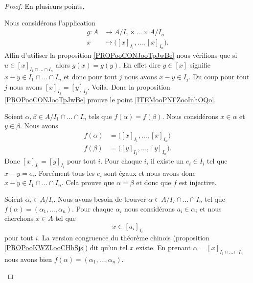 \begin{proof}
	En plusieurs points.
	\begin{subproof}
		Nous considérons l'application
		\begin{equation}
			\begin{aligned}
				g\colon A & \to A/I_1\times \ldots \times A/I_n             \\
				x         & \mapsto \big( [x]_{I_1},\ldots,[x]_{I_n} \big).
			\end{aligned}
		\end{equation}
		Affin d'utiliser la proposition \ref{PROPooCONJooTpJwBe} nous vérifions que si \( u\in [x]_{I_1\cap\ldots \cap I_n}\) alors \( g(x)=g(y)\). En effet dire \( y\in[x]\) signifie \( x-y\in I_1\cap\ldots\cap I_n\) et donc pour tout \( j\) nous avons \( x-y\in I_j\). Du coup pour tout \( j\) nous avons \( [x]_{I_j}=[y]_{I_j}\). Voila. Donc la proposition \ref{PROPooCONJooTpJwBe} prouve le point \ref{ITEMooPNFZooInhOQo}.

		\spitem[Injective]
		Soient \( \alpha,\beta\in A/I_1\cap\ldots\cap I_n\) tels que \( f(\alpha)=f(\beta)\). Nous considérons \( x\in \alpha\) et \( y\in \beta\). Nous avons
		\begin{subequations}
			\begin{align}
				f(\alpha) & =\big( [x]_{I_1},\ldots,[x]_{I_n} \big)  \\
				f(\beta)  & =\big( [y]_{I_1},\ldots,[y]_{I_n} \big).
			\end{align}
		\end{subequations}
		Donc \( [x]_{I_i}=[y]_{I_i}\) pour tout \( i\). Pour chaque \( i\), il existe un \( e_i\in I_i\) tel que \( x-y=e_i\). Forcément tous les \( e_i\) sont égaux et nous avons donc \( x-y\in I_1\cap\ldots\cap I_n\). Cela prouve que \( \alpha=\beta\) et donc que \( f\) est injective.

		\spitem[Surjective]
		Soient \( \alpha_i\in A/I_i\). Nous avons besoin de trouver \( \alpha\in A/I_I\cap\ldots\cap I_n\) tel que \( f(\alpha)=(\alpha_1,\ldots,\alpha_n)\). Pour chaque \( \alpha_i\) nous considérons \( a_i\in \alpha_i\) et nous cherchons \( x\in A\) tel que
		\begin{equation}
			x\in[a_i]_{I_i}
		\end{equation}
		pour tout \( i\). La version congruence du théorème chinois (proposition \ref{PROPooKWZLooCHhSjs}) dit qu'un tel \( x\) existe. En prenant \( \alpha=[x]_{I_1\cap\ldots\cap I_n}\) nous avons bien \( f(\alpha)=(\alpha_1,\ldots,\alpha_n)\).


\end{subproof}
\end{proof}
